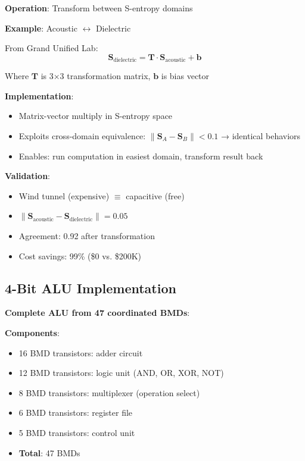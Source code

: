 \documentclass[11pt,a4paper]{article}
\begin{document}
\textbf{Operation}: Transform between S-entropy domains

\textbf{Example}: Acoustic $\leftrightarrow$ Dielectric

From Grand Unified Lab:
\begin{equation}
\mathbf{S}_{\text{dielectric}} = \mathbf{T} \cdot \mathbf{S}_{\text{acoustic}} + \mathbf{b}
\end{equation}

Where $\mathbf{T}$ is 3×3 transformation matrix, $\mathbf{b}$ is bias vector

\textbf{Implementation}:
\begin{itemize}
\item Matrix-vector multiply in S-entropy space
\item Exploits cross-domain equivalence: $\|\mathbf{S}_A - \mathbf{S}_B\| < 0.1$ → identical behaviors
\item Enables: run computation in easiest domain, transform result back
\end{itemize}

\textbf{Validation}:
\begin{itemize}
\item Wind tunnel (expensive) $\equiv$ capacitive (free)
\item $\|\mathbf{S}_{\text{acoustic}} - \mathbf{S}_{\text{dielectric}}\| = 0.05$
\item Agreement: 0.92 after transformation
\item Cost savings: 99\% (\$0 vs. \$200K)
\end{itemize}

\subsection{4-Bit ALU Implementation}

\textbf{Complete ALU from 47 coordinated BMDs}:

\textbf{Components}:
\begin{itemize}
\item 16 BMD transistors: adder circuit
\item 12 BMD transistors: logic unit (AND, OR, XOR, NOT)
\item 8 BMD transistors: multiplexer (operation select)
\item 6 BMD transistors: register file
\item 5 BMD transistors: control unit
\item \textbf{Total}: 47 BMDs
\end{itemize}
\end{document}
